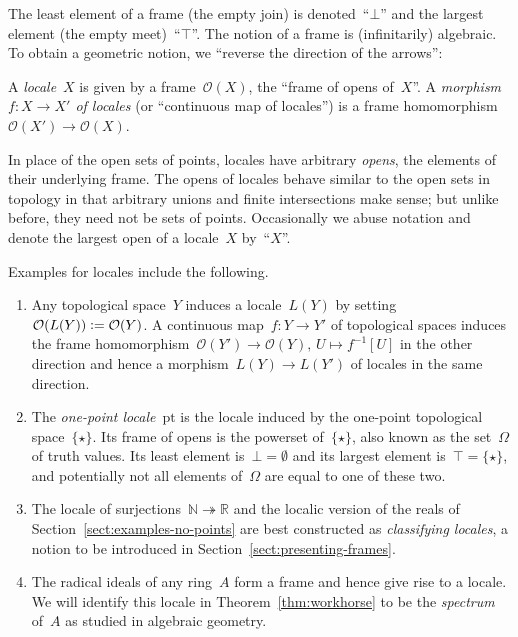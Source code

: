 \documentclass{ws-rv9x6}
\renewcommand{\O}{\mathcal{O}}
\newcommand{\NN}{\mathbb{N}}
\newcommand{\RR}{\mathbb{R}}
\newcommand{\defeq}{\vcentcolon=}
\renewcommand{\_}{\mathpunct{.}}
\newcommand{\?}{\,{:}\,}
\newcommand{\pt}{\mathrm{pt}}
\begin{document}
The least element of a frame (the empty join) is denoted~``$\bot$'' and the
largest element (the empty meet)~``$\top$''. The notion of a frame is
(infinitarily) algebraic. To obtain a geometric notion, we ``reverse the
direction of the arrows'':

\begin{definition}\label{defn:locale}
A \emph{locale}~$X$ is given by a frame~$\O(X)$, the ``frame
of opens of~$X$''. A \emph{morphism~$f : X \to X'$ of locales} (or ``continuous
map of locales'') is a frame homomorphism~$\O(X') \to \O(X)$.\end{definition}

In place of the open sets of points, locales have arbitrary \emph{opens}, the
elements of their underlying frame. The opens of locales behave similar to the
open sets in topology in that arbitrary unions and finite intersections make
sense; but unlike before, they need not be sets of points. Occasionally we
abuse notation and denote the largest open of a locale~$X$ by~``$X$''.

Examples for locales include the following.
\begin{enumerate}
\item Any topological space~$Y$ induces a locale~$L(Y)$ by
setting~$\O(L(Y)) \defeq \O(Y)$. A continuous map~$f : Y \to Y'$ of topological
spaces induces the frame homomorphism~$\O(Y') \to \O(Y),\,U \mapsto f^{-1}[U]$
in the other direction and hence a morphism~$L(Y) \to L(Y')$ of locales in the
same direction.
\item The \emph{one-point locale}~$\pt$ is the locale induced
by the one-point topological space~$\{\star\}$. Its frame of opens is
the powerset of~$\{\star\}$, also known as the set~$\Omega$ of truth
values. Its least element is~$\bot = \emptyset$ and its largest element
is~$\top = \{\star\}$, and potentially not all elements of~$\Omega$ are equal
to one of these two.
\item The locale of surjections~$\NN \twoheadrightarrow \RR$ and the localic
version of the reals of Section~\ref{sect:examples-no-points} are best
constructed as \emph{classifying locales}, a notion to be introduced in
Section~\ref{sect:presenting-frames}.
\item The radical ideals of any ring~$A$ form a frame and hence give rise to a
locale. We will identify this locale in Theorem~\ref{thm:workhorse} to be the
\emph{spectrum} of~$A$ as studied in algebraic geometry.
\end{enumerate}
\end{document}
